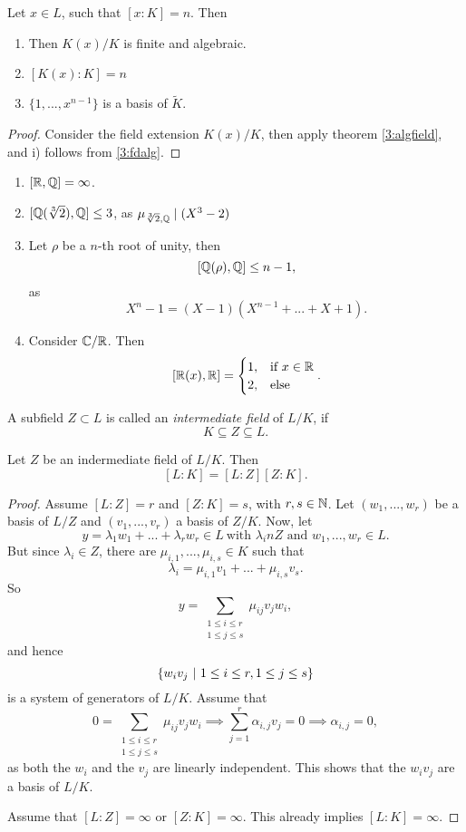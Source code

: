\begin{cor}
  Let $x\in L$, such that $[x:K]=n$. Then
  \begin{enumerate}
    \item Then $K(x)/K$ is finite and algebraic.
    \item $[K(x):K]=n$
    \item $\{1,...,x^{n-1}\}$ is a basis of $\tilde{K}$.
  \end{enumerate}
\end{cor}
\begin{proof}
  Consider the field extension $K(x)/K$, then apply theorem \cref{3:algfield}, and i) follows from \cref{3:fdalg}.
\end{proof}

\begin{bsp}
  \begin{enumerate}
    \item $[\mathbb{R},\mathbb{Q}]=\infty$.
    \item $[\mathbb{Q}(\sqrt[3]{2}),\mathbb{Q}]\leq 3$, as $\mu_{\sqrt[3]{2},\mathbb{Q}}\mid (X^3-2)$
    \item Let $\rho$ be a $n$-th root of unity, then
    \[
    [\mathbb{Q}(\rho),\mathbb{Q}]\leq n-1,\]
    as
    \[
    X^n-1=(X-1)(X^{n-1}+...+X+1).
    \]
    \item Consider $\mathbb{C}/\mathbb{R}$. Then
    \[
    [\mathbb{R}(x),\mathbb{R}]= \begin{cases}1,&\text{if }x\in \mathbb{R}\\2,&\text{else}\end{cases}.
    \]
  \end{enumerate}
\end{bsp}
\begin{defn}
  A subfield $Z\subset L$ is called an \emph{intermediate field} of $L/K$, if
  \[
  K\subseteq Z \subseteq L.
  \]
\end{defn}
\begin{thm}\label{3:deg}
  Let $Z$ be an indermediate field of $L/K$. Then
  \[
  [L:K] = [L:Z][Z:K].
  \]
\end{thm}
\begin{proof}
  Assume $[L:Z]=r$ and $[Z:K]=s$, with $r,s\in \mathbb{N}$. Let $(w_1,...,w_r)$ be a basis of $L/Z$ and $(v_1,...,v_r)$ a basis of $Z/K$. Now, let
  \[
  y=\lambda_1w_1+...+\lambda_rw_r\in L~\text{with }\lambda_in Z\text{ and }w_1,...,w_r\in L.
  \]
  But since $\lambda_i\in Z$, there are $\mu_{i,1},...,\mu_{i,s}\in K$ such that
  \[
  \lambda_i = \mu_{i,1}v_1+...+\mu_{i,s}v_s.
  \]
  So
  \[
  y = \sum_{\substack{1\leq i\leq r\\1\leq j\leq s}} \mu_{ij}v_jw_i,\]
  and hence
  \[
  \{ w_iv_j~|~ 1\leq i\leq r,1\leq j\leq s\}
  \]
  is a system of generators of $L/K$. Assume that
  \[
    0=\sum_{\substack{1\leq i\leq r\\1\leq j\leq s}} \mu_{ij}v_jw_i\implies \sum_{j=1}^r \alpha_{i,j}v_j=0\implies \alpha_{i,j}=0,\]
    as both the $w_i$ and the $v_j$ are linearly independent. This shows that the $w_iv_j$ are a basis of $L/K$.\par
    Assume that $[L:Z]=\infty$ or $[Z:K]=\infty$. This already implies $[L:K]=\infty$.

\end{proof}
